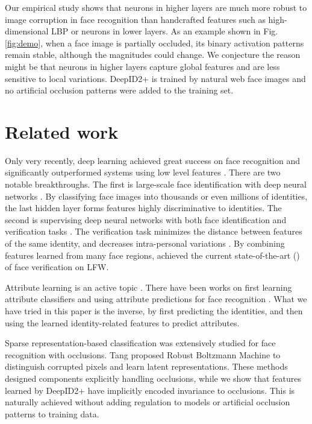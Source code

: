 \documentclass[10pt,twocolumn,letterpaper]{article}
\begin{document}
Our empirical study shows that neurons in higher layers are much more robust to image corruption in face recognition than handcrafted features such as high-dimensional LBP or neurons in lower layers. As an example shown in Fig. \ref{fig:demo}, when a face image is partially occluded, its binary activation patterns remain stable, although the magnitudes could change. We conjecture the reason might be that neurons in higher layers capture global features and are less sensitive to local variations. DeepID2+ is trained by natural web face images and no artificial occlusion patterns were added to the training set.


\section{Related work}

Only very recently, deep learning  achieved great success on face recognition \cite{zhu2013,taigman2014a,sun2014a,sun2014b,taigman2014b} and significantly outperformed systems using low level features \cite{kumar2009,taigman2009,guillaumin2009,yin2011,huang2011,chen2012,berg2012,simonyan2013,chen2013,cao2013}. There are two notable breakthroughs. The first is large-scale face identification with deep neural networks \cite{taigman2014a,sun2014a,taigman2014b}. By classifying face images into thousands or even millions of identities, the last hidden layer  forms features highly discriminative to identities. The second is supervising deep neural networks with both face identification and verification tasks \cite{sun2014b}. The verification task minimizes the distance between features of the same identity, and decreases  intra-personal variations \cite{sun2014b}. By combining features learned  from many face regions, \cite{sun2014b} achieved the current state-of-the-art () of face verification on LFW.

Attribute learning  is  an active  topic \cite{farhadi2009,berg2010,parikh2011,bourdev2011,luo2013,zhang2014}. There have been works on first learning attribute classifiers and using attribute predictions for face recognition \cite{kumar2009,chung2012}. What we have tried in this paper is the inverse, by first predicting the identities, and then using the learned identity-related features to predict attributes.

Sparse representation-based classification \cite{wright2009, yang2010,liu2010,zhang2011a,elhamifar2011,jia2012} was extensively studied for face recognition with occlusions. Tang \etal \cite{tang2012} proposed Robust Boltzmann Machine to distinguish corrupted pixels and learn latent representations. These  methods designed components explicitly handling occlusions, while we show that features learned by DeepID2+ have implicitly encoded  invariance to occlusions. This is naturally achieved without adding regulation to  models or artificial occlusion patterns to  training data.
\end{document}

